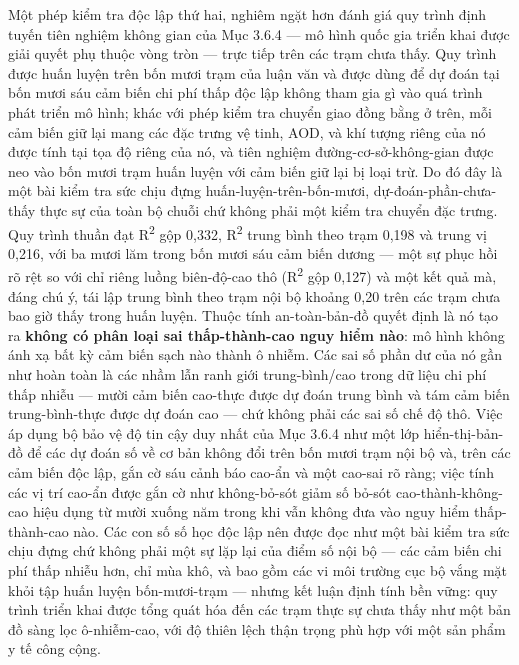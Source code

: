 Một phép kiểm tra độc lập thứ hai, nghiêm ngặt hơn đánh giá quy trình định tuyến tiên nghiệm không gian của Mục 3.6.4 --- mô hình quốc gia triển khai được giải quyết phụ thuộc vòng tròn --- trực tiếp trên các trạm chưa thấy. Quy trình được huấn luyện trên bốn mươi trạm của luận văn và được dùng để dự đoán tại bốn mươi sáu cảm biến chi phí thấp độc lập không tham gia gì vào quá trình phát triển mô hình; khác với phép kiểm tra chuyển giao đồng bằng ở trên, mỗi cảm biến giữ lại mang các đặc trưng vệ tinh, AOD, và khí tượng riêng của nó được tính tại tọa độ riêng của nó, và tiên nghiệm đường-cơ-sở-không-gian được neo vào bốn mươi trạm huấn luyện với cảm biến giữ lại bị loại trừ. Do đó đây là một bài kiểm tra sức chịu đựng huấn-luyện-trên-bốn-mươi, dự-đoán-phần-chưa-thấy thực sự của toàn bộ chuỗi chứ không phải một kiểm tra chuyển đặc trưng. Quy trình thuần đạt R\textsuperscript{2} gộp 0,332, R\textsuperscript{2} trung bình theo trạm 0,198 và trung vị 0,216, với ba mươi lăm trong bốn mươi sáu cảm biến dương --- một sự phục hồi rõ rệt so với chỉ riêng luồng biên-độ-cao thô (R\textsuperscript{2} gộp 0,127) và một kết quả mà, đáng chú ý, tái lập trung bình theo trạm nội bộ khoảng 0,20 trên các trạm chưa bao giờ thấy trong huấn luyện. Thuộc tính an-toàn-bản-đồ quyết định là nó tạo ra \textbf{không có phân loại sai thấp-thành-cao nguy hiểm nào}: mô hình không ánh xạ bất kỳ cảm biến sạch nào thành ô nhiễm. Các sai số phần dư của nó gần như hoàn toàn là các nhầm lẫn ranh giới trung-bình/cao trong dữ liệu chi phí thấp nhiễu --- mười cảm biến cao-thực được dự đoán trung bình và tám cảm biến trung-bình-thực được dự đoán cao --- chứ không phải các sai số chế độ thô. Việc áp dụng bộ bảo vệ độ tin cậy duy nhất của Mục 3.6.4 như một lớp hiển-thị-bản-đồ để các dự đoán số về cơ bản không đổi trên bốn mươi trạm nội bộ và, trên các cảm biến độc lập, gắn cờ sáu cảnh báo cao-ẩn và một cao-sai rõ ràng; việc tính các vị trí cao-ẩn được gắn cờ như không-bỏ-sót giảm số bỏ-sót cao-thành-không-cao hiệu dụng từ mười xuống năm trong khi vẫn không đưa vào nguy hiểm thấp-thành-cao nào. Các con số số học độc lập nên được đọc như một bài kiểm tra sức chịu đựng chứ không phải một sự lặp lại của điểm số nội bộ --- các cảm biến chi phí thấp nhiễu hơn, chỉ mùa khô, và bao gồm các vi môi trường cục bộ vắng mặt khỏi tập huấn luyện bốn-mươi-trạm --- nhưng kết luận định tính bền vững: quy trình triển khai được tổng quát hóa đến các trạm thực sự chưa thấy như một bản đồ sàng lọc ô-nhiễm-cao, với độ thiên lệch thận trọng phù hợp với một sản phẩm y tế công cộng.

